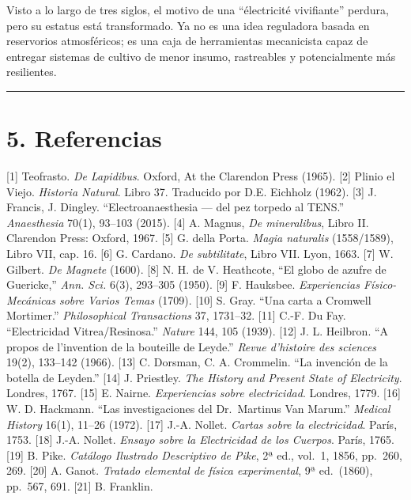 \documentclass[
  10pt,
  letterpaper,
  twocolumn]{article}
\begin{document}
Visto a lo largo de tres siglos, el motivo de una ``électricité
vivifiante'' perdura, pero su estatus está transformado. Ya no es una
idea reguladora basada en reservorios atmosféricos; es una caja de
herramientas mecanicista capaz de entregar sistemas de cultivo de menor
insumo, rastreables y potencialmente más resilientes.

\begin{center}\rule{0.5\linewidth}{0.5pt}\end{center}

\section{5. Referencias}\label{referencias}

{[}1{]} Teofrasto. \emph{De Lapidibus}. Oxford, At the Clarendon Press
(1965). {[}2{]} Plinio el Viejo. \emph{Historia Natural}. Libro 37.
Traducido por D.E. Eichholz (1962). {[}3{]} J. Francis, J. Dingley.
``Electroanaesthesia --- del pez torpedo al TENS.'' \emph{Anaesthesia}
70(1), 93--103 (2015). {[}4{]} A. Magnus, \emph{De mineralibus}, Libro
II. Clarendon Press: Oxford, 1967. {[}5{]} G. della Porta. \emph{Magia
naturalis} (1558/1589), Libro VII, cap. 16. {[}6{]} G. Cardano. \emph{De
subtilitate}, Libro VII. Lyon, 1663. {[}7{]} W. Gilbert. \emph{De
Magnete} (1600). {[}8{]} N. H. de V. Heathcote, ``El globo de azufre de
Guericke,'' \emph{Ann. Sci.} 6(3), 293--305 (1950). {[}9{]} F. Hauksbee.
\emph{Experiencias Físico-Mecánicas sobre Varios Temas} (1709). {[}10{]}
S. Gray. ``Una carta a Cromwell Mortimer.'' \emph{Philosophical
Transactions} 37, 1731--32. {[}11{]} C.-F. Du Fay. ``Electricidad
Vitrea/Resinosa.'' \emph{Nature} 144, 105 (1939). {[}12{]} J. L.
Heilbron. ``A propos de l'invention de la bouteille de Leyde.''
\emph{Revue d'histoire des sciences} 19(2), 133--142 (1966). {[}13{]} C.
Dorsman, C. A. Crommelin. ``La invención de la botella de Leyden.''
{[}14{]} J. Priestley. \emph{The History and Present State of
Electricity}. Londres, 1767. {[}15{]} E. Nairne. \emph{Experiencias
sobre electricidad}. Londres, 1779. {[}16{]} W. D. Hackmann. ``Las
investigaciones del Dr.~Martinus Van Marum.'' \emph{Medical History}
16(1), 11--26 (1972). {[}17{]} J.-A. Nollet. \emph{Cartas sobre la
electricidad}. París, 1753. {[}18{]} J.-A. Nollet. \emph{Ensayo sobre la
Electricidad de los Cuerpos}. París, 1765. {[}19{]} B. Pike.
\emph{Catálogo Ilustrado Descriptivo de Pike}, 2ª ed., vol.~1, 1856,
pp.~260, 269. {[}20{]} A. Ganot. \emph{Tratado elemental de física
experimental}, 9ª ed.~(1860), pp.~567, 691. {[}21{]} B. Franklin.
\end{document}
